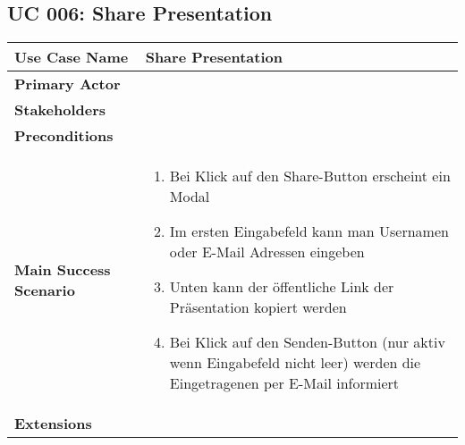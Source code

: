 \subsection{UC 006: Share Presentation}
\label{uc:006-share-pres}

\begin{tabular}{|l|p{}|}
\hline
\textbf{Use Case Name} 	&	Share Presentation	\\ \hline
\textbf{Primary Actor} 	&		\\ \hline
\textbf{Stakeholders}	&		\\ \hline
\textbf{Preconditions}	&		\\ \hline
\textbf{Main Success Scenario}	&
\begin{enumerate}
	\item Bei Klick auf den Share-Button erscheint ein Modal
	\item Im ersten Eingabefeld kann man Usernamen oder E-Mail Adressen eingeben
	\item Unten kann der öffentliche Link der Präsentation kopiert werden
	\item Bei Klick auf den Senden-Button (nur aktiv wenn Eingabefeld nicht leer) werden die Eingetragenen per E-Mail informiert
\end{enumerate}
\\ \hline
\textbf{Extensions}	& 	\\ \hline
\end{tabular}